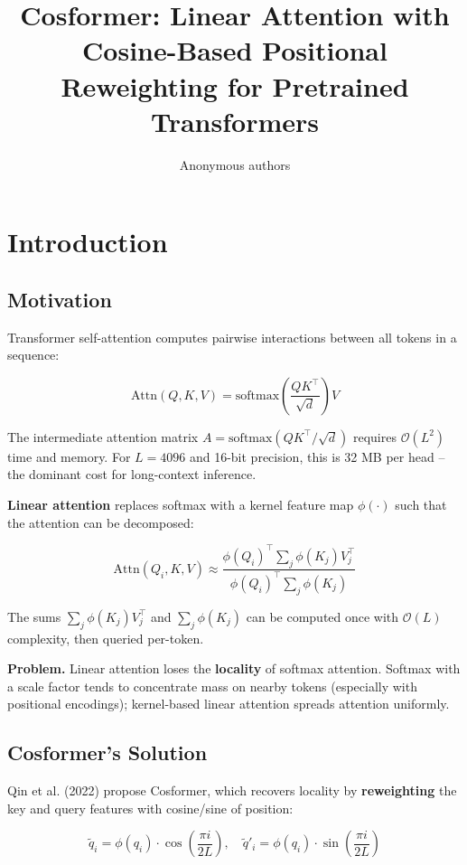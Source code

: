 \title{\textbf{Cosformer: Linear Attention with Cosine-Based Positional Reweighting for Pretrained Transformers}}

\author{Anonymous authors}



\section{Introduction}

\subsection{Motivation}

Transformer self-attention computes pairwise interactions between all tokens 
in a sequence:

\[
\text{Attn}(Q, K, V) = \text{softmax}\!\left(\frac{QK^\top}{\sqrt{d}}\right)V
\]

The intermediate attention matrix $A = \text{softmax}(QK^\top / \sqrt{d})$ 
requires $\mathcal{O}(L^2)$ time and memory. For $L = 4096$ and 16-bit 
precision, this is 32 MB per head -- the dominant cost for long-context 
inference.

\textbf{Linear attention} replaces softmax with a kernel feature map 
$\phi(\cdot)$ such that the attention can be decomposed:

\[
\text{Attn}(Q_i, K, V) \approx \frac{\phi(Q_i)^\top \sum_j \phi(K_j) V_j^\top}{\phi(Q_i)^\top \sum_j \phi(K_j)}
\]

The sums $\sum_j \phi(K_j) V_j^\top$ and $\sum_j \phi(K_j)$ can be computed 
once with $\mathcal{O}(L)$ complexity, then queried per-token.

\textbf{Problem.} Linear attention loses the \textbf{locality} of softmax attention. 
Softmax with a scale factor tends to concentrate mass on nearby tokens 
(especially with positional encodings); kernel-based linear attention 
spreads attention uniformly.

\subsection{Cosformer's Solution}

Qin et al. (2022) propose Cosformer, which recovers locality by 
\textbf{reweighting} the key and query features with cosine/sine of position:

\[
\tilde{q}_i = \phi(q_i) \cdot \cos\!\left(\frac{\pi i}{2 L}\right), \quad
\tilde{q}'_i = \phi(q_i) \cdot \sin\!\left(\frac{\pi i}{2 L}\right)
\]


